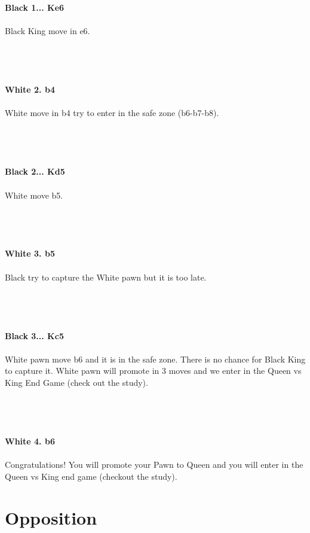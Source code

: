 \documentclass{article}
\begin{document}
\textbf{Black 1... Ke6}\\
\\
Black King move in e6.\\\\
\\

\\
\\
\textbf{White 2. b4}\\
\\
White move in b4 try to enter in the safe zone (b6-b7-b8).\\\\
\\

\\
\\
\textbf{Black 2... Kd5}\\
\\
White move b5.\\\\
\\

\\
\\
\textbf{White 3. b5}\\
\\
Black try to capture the White pawn but it is too late.\\\\
\\

\\
\\
\textbf{Black 3... Kc5}\\
\\
White pawn move b6 and it is in the safe zone. There is no chance for Black King to capture it. White pawn will promote in 3 moves and we enter in the Queen vs King End Game (check out the study).\\\\
\\

\\
\\
\textbf{White 4. b6}\\
\\
Congratulations! You will promote your Pawn to Queen and you will enter in the Queen vs King end game (checkout the study).\\\section{ Opposition}
\end{document}
